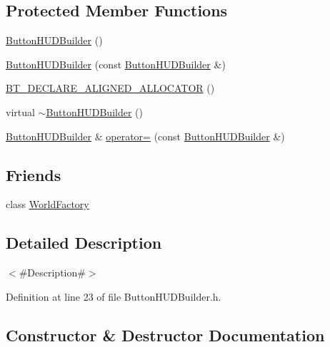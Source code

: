 \subsection*{Protected Member Functions}
\begin{DoxyCompactItemize}
\item 
\mbox{\hyperlink{classnjli_1_1_button_h_u_d_builder_a72f4ab170068007b3ed3d22a785569f5}{Button\+H\+U\+D\+Builder}} ()
\item 
\mbox{\hyperlink{classnjli_1_1_button_h_u_d_builder_a3a49993012dbd9456d13ef822eccc269}{Button\+H\+U\+D\+Builder}} (const \mbox{\hyperlink{classnjli_1_1_button_h_u_d_builder}{Button\+H\+U\+D\+Builder}} \&)
\item 
\mbox{\hyperlink{classnjli_1_1_button_h_u_d_builder_a4e72108d0ff2c0e5503ae0c25009251f}{B\+T\+\_\+\+D\+E\+C\+L\+A\+R\+E\+\_\+\+A\+L\+I\+G\+N\+E\+D\+\_\+\+A\+L\+L\+O\+C\+A\+T\+OR}} ()
\item 
virtual \mbox{\hyperlink{classnjli_1_1_button_h_u_d_builder_a6ebd31ff4f9d157b5fd9d0d2f173d1b1}{$\sim$\+Button\+H\+U\+D\+Builder}} ()
\item 
\mbox{\hyperlink{classnjli_1_1_button_h_u_d_builder}{Button\+H\+U\+D\+Builder}} \& \mbox{\hyperlink{classnjli_1_1_button_h_u_d_builder_aece9616ae7fcb8d690109f73cc416072}{operator=}} (const \mbox{\hyperlink{classnjli_1_1_button_h_u_d_builder}{Button\+H\+U\+D\+Builder}} \&)
\end{DoxyCompactItemize}
\subsection*{Friends}
\begin{DoxyCompactItemize}
\item 
class \mbox{\hyperlink{classnjli_1_1_button_h_u_d_builder_acb96ebb09abe8f2a37a915a842babfac}{World\+Factory}}
\end{DoxyCompactItemize}


\subsection{Detailed Description}
$<$\#\+Description\#$>$ 

Definition at line 23 of file Button\+H\+U\+D\+Builder.\+h.



\subsection{Constructor \& Destructor Documentation}
\mbox{\label{classnjli_1_1_button_h_u_d_builder_a72f4ab170068007b3ed3d22a785569f5}} 

